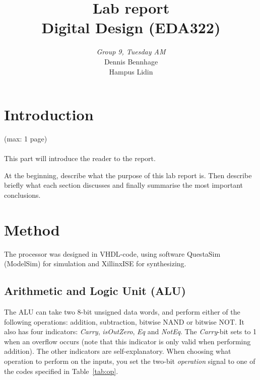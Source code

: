 \documentclass[a4,11pt]{article}
\begin{document}
\pagestyle{empty}
\begin{titlepage}

	\title{\Huge{Lab report} \\[0.1cm] \Large{Digital Design (EDA322)} \\[0.4cm]}
	\author{\large{\emph{Group 9, Tuesday AM}} \\[0.2cm] Dennis Bennhage \\[0.05cm] Hampus Lidin \\[0.1cm]}
	\maketitle
	\thispagestyle{empty}
\end{titlepage}
\clearpage
\pagestyle{fancyplain}
\tableofcontents
\clearpage
\setcounter{page}{1}
\section{Introduction}
(max: 1 page)
\\\\
This part will introduce the reader to the report. 

At the beginning, describe what the purpose of this lab report is. Then describe briefly what each section discusses and finally summarise the most important conclusions. 

\section{Method}
The processor was designed in VHDL-code, using software QuestaSim (ModelSim) for simulation and
XillinxISE for synthesizing. 

\subsection{Arithmetic and Logic Unit (ALU)}
The ALU can take two 8-bit unsigned data words, and perform either of the following operations:
addition, subtraction, bitwise NAND or bitwise NOT. It also has four indicators: {\it Carry},
{\it isOutZero}, {\it Eq} and {\it NotEq}. The {\it Carry}-bit sets to 1 when an overflow occurs
(note that this indicator is only valid when performing addition). The other indicators are
self-explanatory. When choosing what operation to perform on the inputs, you set the two-bit
{\it operation} signal to one of the codes specified in Table~\ref{tab:op}.
\end{document}
